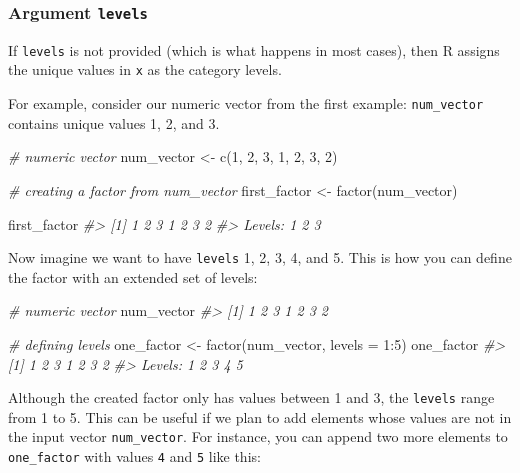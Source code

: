 \documentclass[
]{book}
\newenvironment{Shaded}{\begin{snugshade}}{\end{snugshade}}
\newcommand{\AttributeTok}[1]{\textcolor[rgb]{0.77,0.63,0.00}{#1}}
\newcommand{\CommentTok}[1]{\textcolor[rgb]{0.56,0.35,0.01}{\textit{#1}}}
\newcommand{\DecValTok}[1]{\textcolor[rgb]{0.00,0.00,0.81}{#1}}
\newcommand{\FunctionTok}[1]{\textcolor[rgb]{0.00,0.00,0.00}{#1}}
\newcommand{\NormalTok}[1]{#1}
\newcommand{\OtherTok}[1]{\textcolor[rgb]{0.56,0.35,0.01}{#1}}
\newcommand{\SpecialCharTok}[1]{\textcolor[rgb]{0.00,0.00,0.00}{#1}}
\begin{document}
\hypertarget{argument-levels}{%
\subsubsection*{\texorpdfstring{Argument \texttt{levels}}{Argument levels}}\label{argument-levels}}

If \texttt{levels} is not provided (which is what happens in most cases), then R
assigns the unique values in \texttt{x} as the category levels.

For example, consider our numeric vector from the first example: \texttt{num\_vector}
contains unique values 1, 2, and 3.

\begin{Shaded}
\begin{Highlighting}[]
\CommentTok{\# numeric vector}
\NormalTok{num\_vector }\OtherTok{\textless{}{-}} \FunctionTok{c}\NormalTok{(}\DecValTok{1}\NormalTok{, }\DecValTok{2}\NormalTok{, }\DecValTok{3}\NormalTok{, }\DecValTok{1}\NormalTok{, }\DecValTok{2}\NormalTok{, }\DecValTok{3}\NormalTok{, }\DecValTok{2}\NormalTok{)}

\CommentTok{\# creating a factor from num\_vector}
\NormalTok{first\_factor }\OtherTok{\textless{}{-}} \FunctionTok{factor}\NormalTok{(num\_vector)}

\NormalTok{first\_factor}
\CommentTok{\#\textgreater{} [1] 1 2 3 1 2 3 2}
\CommentTok{\#\textgreater{} Levels: 1 2 3}
\end{Highlighting}
\end{Shaded}

Now imagine we want to have \texttt{levels} 1, 2, 3, 4, and 5. This is how you can
define the factor with an extended set of levels:

\begin{Shaded}
\begin{Highlighting}[]
\CommentTok{\# numeric vector}
\NormalTok{num\_vector}
\CommentTok{\#\textgreater{} [1] 1 2 3 1 2 3 2}

\CommentTok{\# defining levels}
\NormalTok{one\_factor }\OtherTok{\textless{}{-}} \FunctionTok{factor}\NormalTok{(num\_vector, }\AttributeTok{levels =} \DecValTok{1}\SpecialCharTok{:}\DecValTok{5}\NormalTok{)}
\NormalTok{one\_factor}
\CommentTok{\#\textgreater{} [1] 1 2 3 1 2 3 2}
\CommentTok{\#\textgreater{} Levels: 1 2 3 4 5}
\end{Highlighting}
\end{Shaded}

Although the created factor only has values between 1 and 3, the \texttt{levels} range
from 1 to 5. This can be useful if we plan to add elements whose values are not
in the input vector \texttt{num\_vector}. For instance, you can append two more elements
to \texttt{one\_factor} with values \texttt{4} and \texttt{5} like this:
\end{document}
